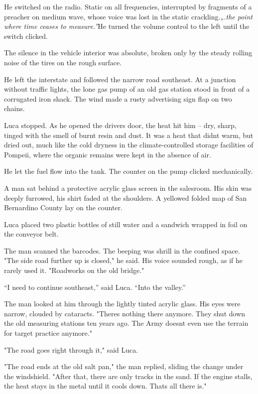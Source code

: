 \documentclass[
  ngerman,
]{article}
\begin{document}
He switched on the radio. Static on all frequencies, interrupted by
fragments of a preacher on medium wave, whose voice was lost in the
static crackling.\emph{„.the point where time ceases to measure.''}He
turned the volume control to the left until the switch clicked.

The silence in the vehicle interior was absolute, broken only by the
steady rolling noise of the tires on the rough surface.

He left the interstate and followed the narrow road southeast. At a
junction without traffic lights, the lone gas pump of an old gas station
stood in front of a corrugated iron shack. The wind made a rusty
advertising sign flap on two chains.

Luca stopped. As he opened the driver\textquotesingle s door, the heat
hit him -- dry, sharp, tinged with the smell of burnt resin and dust. It
was a heat that didn\textquotesingle t warm, but dried out, much like
the cold dryness in the climate-controlled storage facilities of
Pompeii, where the organic remains were kept in the absence of air.

He let the fuel flow into the tank. The counter on the pump clicked
mechanically.

A man sat behind a protective acrylic glass screen in the salesroom. His
skin was deeply furrowed, his shirt faded at the shoulders. A yellowed
folded map of San Bernardino County lay on the counter.

Luca placed two plastic bottles of still water and a sandwich wrapped in
foil on the conveyor belt.

The man scanned the barcodes. The beeping was shrill in the confined
space. "The side road further up is closed," he said. His voice sounded
rough, as if he rarely used it. "Roadworks on the old bridge."

``I need to continue southeast,'' said Luca. ``Into the valley.''

The man looked at him through the lightly tinted acrylic glass. His eyes
were narrow, clouded by cataracts. "There\textquotesingle s nothing
there anymore. They shut down the old measuring stations ten years ago.
The Army doesn\textquotesingle t even use the terrain for target
practice anymore."

"The road goes right through it," said Luca.

"The road ends at the old salt pan," the man replied, sliding the change
under the windshield. "After that, there are only tracks in the sand. If
the engine stalls, the heat stays in the metal until it cools down.
That\textquotesingle s all there is."
\end{document}
